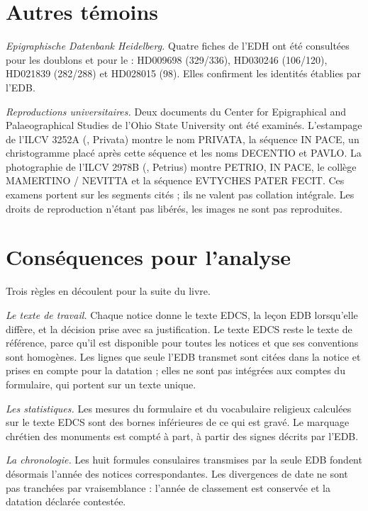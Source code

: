 \section{Autres témoins}

\emph{Epigraphische Datenbank Heidelberg.} Quatre fiches de l’EDH ont été consultées pour les doublons et pour le  : HD009698 (329/336), HD030246 (106/120), HD021839 (282/288) et HD028015 (98). Elles confirment les identités établies par l’EDB.

\emph{Reproductions universitaires.} Deux documents du Center for Epigraphical and Palaeographical Studies de l’Ohio State University ont été examinés. L’estampage de l’ILCV 3252A (, Privata) montre le nom PRIVATA, la séquence IN PACE, un christogramme placé après cette séquence et les noms DECENTIO et PAVLO. La photographie de l’ILCV 2978B (, Petrius) montre PETRIO, IN PACE, le collège MAMERTINO / NEVITTA et la séquence EVTYCHES PATER FECIT. Ces examens portent sur les segments cités ; ils ne valent pas collation intégrale. Les droits de reproduction n’étant pas libérés, les images ne sont pas reproduites.

\section{Conséquences pour l’analyse}

Trois règles en découlent pour la suite du livre.

\emph{Le texte de travail.} Chaque notice donne le texte EDCS, la leçon EDB lorsqu’elle diffère, et la décision prise avec sa justification. Le texte EDCS reste le texte de référence, parce qu’il est disponible pour toutes les notices et que ses conventions sont homogènes. Les lignes que seule l’EDB transmet sont citées dans la notice et prises en compte pour la datation ; elles ne sont pas intégrées aux comptes du formulaire, qui portent sur un texte unique.

\emph{Les statistiques.} Les mesures du formulaire et du vocabulaire religieux calculées sur le texte EDCS sont des bornes inférieures de ce qui est gravé. Le marquage chrétien des monuments est compté à part, à partir des signes décrits par l’EDB.

\emph{La chronologie.} Les huit formules consulaires transmises par la seule EDB fondent désormais l’année des notices correspondantes. Les divergences de date ne sont pas tranchées par vraisemblance : l’année de classement est conservée et la datation déclarée contestée.
